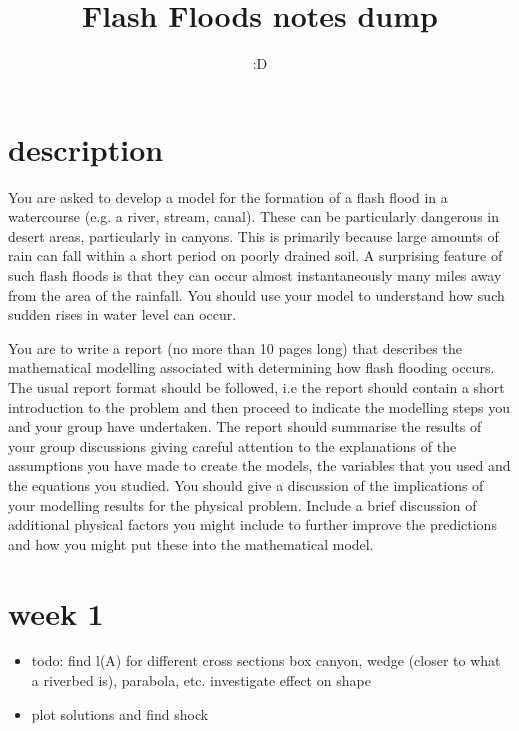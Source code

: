 \documentclass[12pt]{article}
\title{Flash Floods notes dump}
\author{:D}
\begin{document}
\maketitle
\section{description}
You are asked to develop a model for the formation of a flash flood in a watercourse (e.g.
a river, stream, canal). These can be particularly dangerous in desert areas, particularly in
canyons. This is primarily because large amounts of rain can fall within a short period on
poorly drained soil. A surprising feature of such flash floods is that they can occur almost
instantaneously many miles away from the area of the rainfall. You should use your model
to understand how such sudden rises in water level can occur.

You are to write a report (no more than 10 pages long) that describes the mathematical
modelling associated with determining how flash flooding occurs. The usual report format
should be followed, i.e the report should contain a short introduction to the problem and
then proceed to indicate the modelling steps you and your group have undertaken. The
report should summarise the results of your group discussions giving careful attention to the
explanations of the assumptions you have made to create the models, the variables that you
used and the equations you studied. You should give a discussion of the implications of your
modelling results for the physical problem. Include a brief discussion of additional physical
factors you might include to further improve the predictions and how you might put these
into the mathematical model.
\section{week 1}
\begin{itemize}
    \item todo: find l(A) for different cross sections
box canyon, wedge (closer to what a riverbed is), parabola, etc. investigate effect on shape
    \item plot solutions and find shock
\end{itemize}
\end{document}
